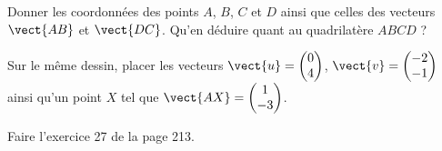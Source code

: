 
\begin{exercice}\label{exosmath-0590}

    Donner les coordonnées des points \( A\), \( B\), \( C\) et \( D\) ainsi que celles des vecteurs \( \vect{ AB }\) et \( \vect{ DC }\). Qu'en déduire quant au quadrilatère \( ABCD\) ?

    \begin{center}
   
    \end{center}

    Sur le même dessin, placer les vecteurs \( \vect{ u }=\begin{pmatrix}
        0    \\ 
        4    
    \end{pmatrix}\), \( \vect{ v }=\begin{pmatrix}
        -2    \\ 
        -1    
    \end{pmatrix}\) ainsi qu'un point \( X\) tel que \( \vect{ AX }=\begin{pmatrix}
        1    \\ 
        -3    
    \end{pmatrix}\).

    Faire l'exercice 27 de la page 213.

\end{exercice}
